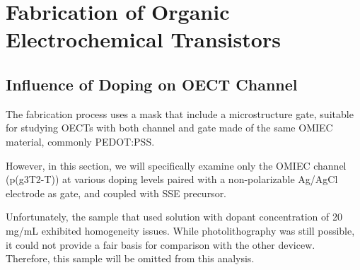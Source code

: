 
\section{Fabrication of Organic Electrochemical Transistors}


\subsection{Influence of Doping on OECT Channel}
The fabrication process uses a mask that include a microstructure gate, suitable for studying OECTs with both channel and gate made of the same OMIEC material, commonly PEDOT:PSS. %

However, in this section, we will specifically examine only the OMIEC channel (p(g3T2-T)) at various doping levels paired with a non-polarizable Ag/AgCl electrode as gate, and coupled with SSE precursor.

Unfortunately, the sample that used solution with dopant concentration of 20 mg/mL exhibited homogeneity issues. While photolithography was still possible, it could not provide a fair basis for comparison with the other devicew. Therefore, this sample will be omitted from this analysis.

